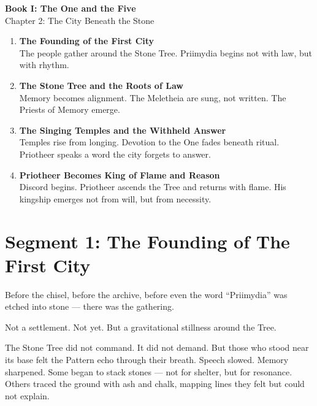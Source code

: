 \documentclass[10pt]{article}
\begin{document}
\begin{center}
    \Large\textbf{Book I: The One and the Five} \\
    \large Chapter 2: The City Beneath the Stone \\
\end{center}

\vspace{1in}


\begin{center}
\begin{enumerate}
    \item \textbf{The Founding of the First City} \\
    The people gather around the Stone Tree. Priimydia begins not with law, but with rhythm.
    \vspace{1in}
    \item \textbf{The Stone Tree and the Roots of Law} \\
      Memory becomes alignment. The Meletheia are sung, not written. The Priests of Memory emerge.
    \vspace{1in}
    \item \textbf{The Singing Temples and the Withheld Answer} \\
     Temples rise from longing. Devotion to the One fades beneath ritual. Priotheer speaks a word the city forgets to answer.
    \vspace{1in}
    \item \textbf{Priotheer Becomes King of Flame and Reason} \\
    Discord begins. Priotheer ascends the Tree and returns with flame. His kingship emerges not from will, but from necessity.

\end{enumerate}
\end{center}

\newpage

\section*{Segment 1: The Founding of The First City}

Before the chisel, before the archive, before even the word “Priimydia” was etched into stone — there was the gathering.

Not a settlement. Not yet.  
But a gravitational stillness around the Tree.

The Stone Tree did not command. It did not demand.  
But those who stood near its base felt the Pattern echo through their breath.  
Speech slowed. Memory sharpened.  
Some began to stack stones — not for shelter, but for resonance.  
Others traced the ground with ash and chalk, mapping lines they felt but could not explain.
\end{document}
